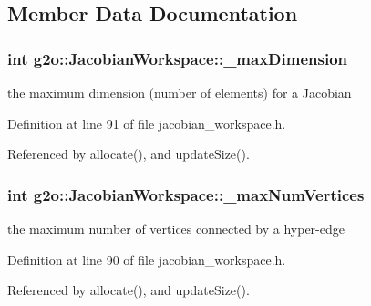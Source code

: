 \subsection{Member Data Documentation}
\subsubsection[{\texorpdfstring{\+\_\+max\+Dimension}{_maxDimension}}]{\setlength{\rightskip}{0pt plus 5cm}int g2o\+::\+Jacobian\+Workspace\+::\+\_\+max\+Dimension\hspace{0.3cm}{\ttfamily [protected]}}\hypertarget{classg2o_1_1JacobianWorkspace_aa6cd4fb8bc1bb4fe9ada55d9feefc817}{}\label{classg2o_1_1JacobianWorkspace_aa6cd4fb8bc1bb4fe9ada55d9feefc817}


the maximum dimension (number of elements) for a Jacobian 



Definition at line 91 of file jacobian\+\_\+workspace.\+h.



Referenced by allocate(), and update\+Size().

\subsubsection[{\texorpdfstring{\+\_\+max\+Num\+Vertices}{_maxNumVertices}}]{\setlength{\rightskip}{0pt plus 5cm}int g2o\+::\+Jacobian\+Workspace\+::\+\_\+max\+Num\+Vertices\hspace{0.3cm}{\ttfamily [protected]}}\hypertarget{classg2o_1_1JacobianWorkspace_a640c84c19a739ce3116fc02c3a66b096}{}\label{classg2o_1_1JacobianWorkspace_a640c84c19a739ce3116fc02c3a66b096}


the maximum number of vertices connected by a hyper-\/edge 



Definition at line 90 of file jacobian\+\_\+workspace.\+h.



Referenced by allocate(), and update\+Size().

